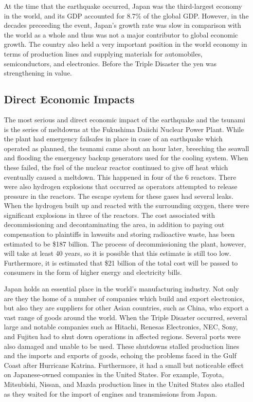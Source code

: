 \documentclass[%
 reprint,
 amsmath,amssymb,
 aps,
]{revtex4-1}
\begin{document}
At the time that the earthquake occurred, Japan was the third-largest economy in the world, and its GDP accounted for 8.7\% of the global GDP. However, in the decades preceeding the event, Japan's growth rate was slow in comparison with the world as a whole and thus was not a major contributor to global economic growth. The country also held a very important position in the world economy in terms of production lines and supplying materials for automobiles, semiconductors, and electronics. Before the Triple Disaster the yen was strengthening in value. \cite{nanto_2011} 

\subsection{\label{sec:level2} Direct Economic Impacts}

The most serious and direct economic impact of the earthquake and the tsunami is the series of meltdowns at the Fukushima Daiichi Nuclear Power Plant. While the plant had emergency failsafes in place in case of an earthquake which operated as planned, the tsunami came about an hour later, breeching the seawall and flooding the emergency backup generators used for the cooling system. When these failed, the fuel of the nuclear reactor continued to give off heat which eventually caused a meltdown. This happened in four of the 6 reactors. There were also hydrogen explosions that occurred as operators attempted to release pressure in the reactors. The escape system for these gases had several leaks. When the hydrogen built up and reacted with the surrounding oxygen, there were significant explosions in three of the reactors. \cite{youtube_2012} The cost associated with decommissioning and decontaminating the area, in addition to paying out compensation to plaintiffs in lawsuits and storing radioactive waste, has been estimated to be \$187 billion. The process of decommissioning the plant, however, will take at least 40 years, so it is possible that this estimate is still too low. Furthermore, it is estimated that \$21 billion of the total cost will be passed to consumers in the form of higher energy and electricity bills. \cite{mccurry_2017}

Japan holds an essential place in the world's manufacturing industry. Not only are they the home of a number of companies which build and export electronics, but also they are suppliers for other Asian countries, such as China, who export a vast range of goods around the world. When the Triple Disaster occurred, several large and notable companies such as Hitachi, Renesas Electronics, NEC, Sony, and Fujitsu had to shut down operations in affected regions. Several ports were also damaged and unable to be used. These shutdowns stalled production lines and the imports and exports of goods, echoing the problems faced in the Gulf Coast after Hurricane Katrina. Furthermore, it had a small but noticeable effect on Japanese-owned companies in the United States. For example, Toyota, Mitsubishi, Nissan, and Mazda production lines in the United States also stalled as they waited for the import of engines and transmissions from Japan. \cite{nanto_2011}
\end{document}
